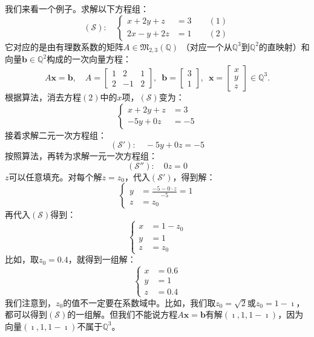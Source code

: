 \documentclass[12pt,UTF8]{ctexbook}
\begin{document}
我们来看一个例子。求解以下方程组：
$$ (\mathcal{S}):\quad \left\{
    \begin{array}{rl}
x + 2y + z &= 3 \quad \quad (1)\\
2x - y + 2z &= 1  \quad \quad (2)
\end{array}
\right. $$
它对应的是由有理数系数的矩阵$A \in \mathfrak{M}_{2,3}(\mathbb{Q})$
（对应一个从$\mathbb{Q}^3$到$\mathbb{Q}^2$的直映射）和向量$\mathbf{b}\in \mathbb{Q}^2$构成的一次向量方程：
$$ A\mathbf{x} = \mathbf{b}, \quad A = \begin{bmatrix}1 & 2 & 1 \\ 2 & -1 & 2\end{bmatrix}, \,\,\, \mathbf{b} = \begin{bmatrix} 3 \\ 1 \end{bmatrix}, \,\,\, \mathbf{x} = \begin{bmatrix} x \\ y \\ z \end{bmatrix} \in \mathbb{Q}^3.$$
根据算法，消去方程$(2)$中的$x$项，$(\mathcal{S})$变为：
$$ \left\{
    \begin{array}{rl}
x + 2y + z &= 3 \\
 - 5y + 0z &= -5  
\end{array}
\right. $$
接着求解二元一次方程组：
$$ (\mathcal{S}'):\quad  - 5y + 0z = -5 $$
按照算法，再转为求解一元一次方程组：
$$ (\mathcal{S}''):\quad  0z = 0 $$
$z$可以任意填充。对每个解$z = z_0$，代入$(\mathcal{S}')$，得到解：
$$ \left\{
    \begin{array}{rl}
y &=\frac{-5 - 0\cdot z}{-5} = 1 \\
 z &= z_0 
\end{array}
\right. $$
再代入$(\mathcal{S})$得到：
$$ \left\{
    \begin{array}{rl}
x &= 1 - z_0 \\
y &= 1 \\
 z &= z_0
\end{array}
\right. $$
比如，取$z_0 = 0.4$，就得到一组解：
$$ \left\{
    \begin{array}{rl}
x &= 0.6  \\
y &= 1 \\
z &= 0.4  
\end{array}
\right. $$
我们注意到，$z_0$的值不一定要在系数域中。比如，我们取$z_0 = \sqrt{2}$或$z_0 = 1 - \imath $，都可以得到$(\mathcal{S})$的一组解。但我们不能说方程$A\mathbf{x} = \mathbf{b}$有解$(\imath , 1, 1 - \imath )$，因为向量$(\imath , 1, 1 - \imath )$不属于$\mathbb{Q}^3$。
\end{document}
